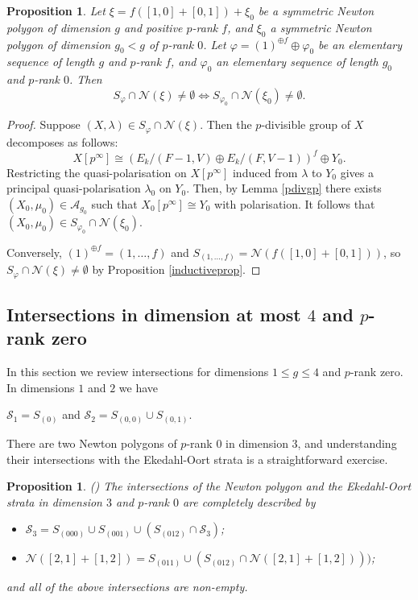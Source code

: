\documentclass[11pt,table]{amsart}
\numberwithin{equation}{section}
\newtheorem{prop}[thm]{Proposition}
\theoremstyle{definition}
\theoremstyle{remark}
\theoremstyle{remark}
\begin{document}
\begin{prop} \label{positiveintersectionsprop}
    Let $\xi = f([1,0] + [0,1]) + \xi_0$ be a symmetric Newton polygon of dimension $g$ and positive $p$-rank $f$, and $\xi_0$ a symmetric Newton polygon of dimension $g_0 < g$ of $p$-rank $0$. Let $\varphi = (1)^{\oplus f} \oplus\varphi_0$ be an elementary sequence of length $g$ and $p$-rank $f$, and $\varphi_0$ an elementary sequence of length $g_0$ and $p$-rank $0$. Then 
    $$ S_{\varphi} \cap \mathcal{N}(\xi) \ne \emptyset \iff S_{\varphi_0} \cap \mathcal{N}(\xi_0) \ne \emptyset. $$
\end{prop}
\begin{proof} 
Suppose $(X,\lambda)\in S_\varphi \cap \mathcal{N}(\xi)$. Then the $p$-divisible group of $X$ decomposes as follows:
\[
X[p^\infty] \cong \left(E_k/(F-1,V) \oplus E_k/(F,V-1)\right)^f \oplus Y_0.
\]
Restricting the quasi-polarisation on $X[p^\infty]$ induced from $\lambda$ to $Y_0$ gives a principal quasi-polarisation $\lambda_0$ on $Y_0$. Then, by Lemma \ref{pdivgp} there exists $(X_0,\mu_0) \in \mathcal{A}_{g_0}$ such that $X_0[p^\infty] \cong Y_0$ with polarisation. It follows that $(X_0,\mu_0) \in S_{\varphi_0} \cap \mathcal{N}(\xi_0)$.

Conversely, $(1)^{\oplus f} = (1, \ldots, f)$ and $S_{(1, \ldots, f)} = \mathcal{N}(f([1,0] + [0,1]))$, so $ S_{\varphi} \cap \mathcal{N}(\xi) \ne \emptyset$ by Proposition \ref{inductiveprop}.    
\end{proof}

\subsection{Intersections in dimension at most $4$ and $p$-rank zero}
\label{lowerdims} In this section we review intersections for dimensions $1 \le g \le 4$ and $p$-rank zero. In dimensions $1$ and $2$ we have
\begin{center}
    $\mathcal{S}_{1} = S_{(0)}$ and $ \mathcal{S}_{2} = S_{(0,0)} \cup S_{(0,1)}$.
\end{center}
There are two Newton polygons of $p$-rank $0$ in dimension $3$, and understanding their intersections with the Ekedahl-Oort strata is a straightforward exercise.
\begin{prop}{(\cite[Example 3.5]{karemaker2024geometry})} \label{dimension3intersections}
The intersections of the Newton polygon and the Ekedahl-Oort strata in dimension $3$ and $p$-rank $0$ are completely described  by 
\begin{itemize}
    \item  $\mathcal{S}_{3} = S_{(000)} \cup S_{(001)} \cup ( S_{(012)} \cap \mathcal{S}_{3})$;
    \item $ \mathcal{N}([2,1] + [1,2] ) = S_{(011)} \cup ( S_{(012)} \cap \mathcal{N}([2,1] + [1,2])))$;
    \end{itemize}
and all of the above intersections are non-empty.
\end{prop}
\end{document}
